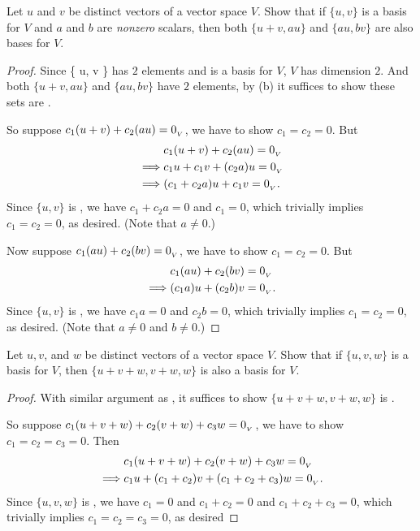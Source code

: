 \begin{exercise} \label{exercise 1.6.11}
Let \(u\) and \(v\) be distinct vectors of a vector space \(V\).
Show that if \(\{ u, v \}\) is a basis for \(V\) and \(a\) and \(b\) are \emph{nonzero} scalars,
then both \(\{ u + v, au \}\) and \(\{ au, bv \}\) are also bases for \(V\).
\end{exercise}

\begin{proof}
Since \{ u, v \} has \(2\) elements and is a basis for \(V\), \(V\) has dimension \(2\).
And both \(\{ u + v, au \}\) and \(\{ au, bv \}\) have \(2\) elements, by (b) it suffices to show these sets are \LID{}.

So suppose \(c_1 (u + v) + c_2 (au) = 0_{_V}\), we have to show \(c_1 = c_2 = 0\).
But
\begin{align*}
             & c_1 (u + v) + c_2 (au) = 0_{_V} \\
    \implies & c_1 u + c_1 v + (c_2 a) u = 0_{_V} \\
    \implies & (c_1 + c_2 a) u + c_1 v = 0_{_V}.
\end{align*}
Since \(\{ u, v \}\) is \LID{}, we have \(c_1 + c_2 a = 0\) and \(c_1 = 0\), which trivially implies \(c_1 = c_2 = 0\), as desired. (Note that \(a \ne 0\).)

Now suppose \(c_1 (au) + c_2 (bv) = 0_{_V}\), we have to show \(c_1 = c_2 = 0\).
But
\begin{align*}
             & c_1 (au) + c_2 (bv) = 0_{_V} \\
    \implies & (c_1 a) u + (c_2 b) v = 0_{_V}.
\end{align*}
Since \(\{ u, v \}\) is \LID{}, we have \(c_1 a = 0\) and \(c_2 b = 0\), which trivially implies \(c_1 = c_2 = 0\), as desired. (Note that \(a \ne 0\) and \(b \ne 0\).)
\end{proof}

\begin{exercise} \label{exercise 1.6.12}
Let \(u, v\), and \(w\) be distinct vectors of a vector space \(V\).
Show that if \(\{ u, v, w \}\) is a basis for \(V\), then \(\{ u + v + w, v + w, w \}\) is also a basis for \(V\).
\end{exercise}

\begin{proof}
With similar argument as , it suffices to show \(\{ u + v + w, v + w, w \}\) is \LID{}.

So suppose \(c_1(u + v + w) + c_2(v + w) + c_3w = 0_{_V}\), we have to show \(c_1 = c_2 = c_3 = 0\).
Then
\begin{align*}
             & c_1(u + v + w) + c_2(v + w) + c_3w = 0_{_V} \\
    \implies & c_1 u + (c_1 + c_2) v + (c_1 + c_2 + c_3) w = 0_{_V}.
\end{align*}
Since \(\{ u, v, w \}\) is \LID{}, we have \(c_1 = 0\) and \(c_1 + c_2 = 0\) and \(c_1 + c_2 + c_3 = 0\), which trivially implies \(c_1 = c_2 = c_3 = 0\), as desired
\end{proof}

